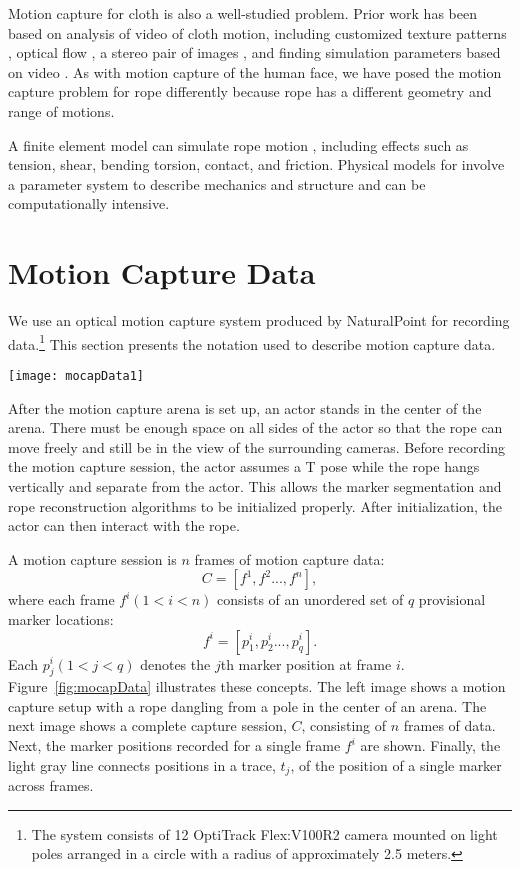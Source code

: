 Motion capture for cloth is also a well-studied problem.  Prior work has been based on analysis of video of cloth motion, including customized texture patterns \cite{whiteRyan2007siggraph}, optical flow \cite{MarcusVolker04clothmotion}, a stereo pair of images \cite{PritchardDavid2003}, and finding simulation parameters based on video \cite{Bhat2003}.  As with motion capture of the human face, we have posed the motion capture problem for rope differently because rope has a different geometry and range of motions. 

A finite element model can simulate rope motion \cite{jiangWGIJMS1999}, including effects such as tension, shear, bending torsion, contact, and friction. Physical models for involve a parameter system to describe mechanics and structure and can be computationally intensive.

\section{Motion Capture Data} 

We use an optical motion capture system produced by NaturalPoint for recording data.\footnote{The system consists of 12 OptiTrack Flex:V100R2 camera mounted on light poles arranged in a circle with a radius of approximately 2.5 meters.} This section presents the notation used to describe motion capture data. 

\begin{figure*}[tb]
\texttt{[image: mocapData1]}
\caption{Motion capture setup and notation for describing captured data.}
\label{fig:mocapData} 
\end{figure*}

After the motion capture arena is set up, an actor stands in the center of the arena. There must be enough space on all sides of the actor so that the rope can move freely and still be in the view of the surrounding cameras. Before recording the motion capture session, the actor assumes a T pose while the rope hangs vertically and separate from the actor.  This allows the marker segmentation and rope reconstruction algorithms to be initialized properly. After initialization, the actor can then interact with the rope. 

A motion capture session is $n$ frames of motion capture data:
\[
C=[f^1,f^2...,f^n],
\]
where each frame $f^i(1<i<n)$ consists of an unordered set of $q$ provisional marker locations:
\[
	   f^i=[p_1^i,p_2^i...,p_q^i].
\]
Each $p_j^i (1<j<q)$ denotes the $j$th marker position at frame $i$.  Figure~\ref{fig:mocapData} illustrates these concepts.  The left image shows a motion capture setup with a rope dangling from a pole in the center of an arena.  The next image shows a complete capture session, $C$, consisting of $n$ frames of data.  Next, the marker positions recorded for a single frame $f^i$ are shown.  Finally, the light gray line connects positions in a trace, $t_j$, of the position of a single marker across frames.  

